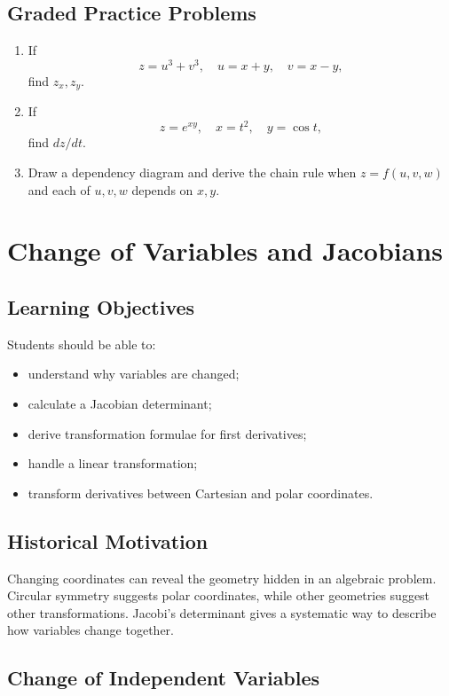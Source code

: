 \documentclass[11pt,oneside]{book}
\theoremstyle{studentthm}
\theoremstyle{definition}
\begin{document}
\section{Graded Practice Problems}
\begin{enumerate}
\item If
\[
z=u^3+v^3,\quad u=x+y,\quad v=x-y,
\]
find \(z_x,z_y\).
\item If
\[
z=e^{xy},\quad x=t^2,\quad y=\cos t,
\]
find \(dz/dt\).
\item Draw a dependency diagram and derive the chain rule when
\(z=f(u,v,w)\) and each of \(u,v,w\) depends on \(x,y\).
\end{enumerate}

\chapter{Change of Variables and Jacobians}

\section*{Learning Objectives}
Students should be able to:
\begin{itemize}
\item understand why variables are changed;
\item calculate a Jacobian determinant;
\item derive transformation formulae for first derivatives;
\item handle a linear transformation;
\item transform derivatives between Cartesian and polar coordinates.
\end{itemize}

\section*{Historical Motivation}

Changing coordinates can reveal the geometry hidden in an algebraic
problem. Circular symmetry suggests polar coordinates, while other
geometries suggest other transformations. Jacobi's determinant gives a
systematic way to describe how variables change together.

\section{Change of Independent Variables}
\end{document}
